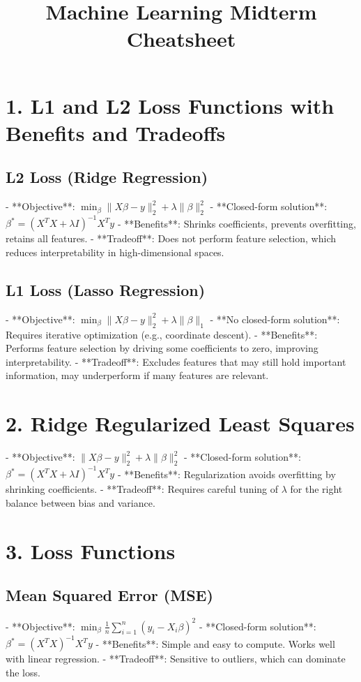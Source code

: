 \documentclass[10pt]{article}
\title{\vspace{-2cm} Machine Learning Midterm Cheatsheet}
\date{}
\begin{document}
\footnotesize
\begin{multicols}{2}

\section*{1. L1 and L2 Loss Functions with Benefits and Tradeoffs}
\subsection*{L2 Loss (Ridge Regression)}
- **Objective**: $\min_{\beta} \|X\beta - y\|_2^2 + \lambda \|\beta\|_2^2$
- **Closed-form solution**: $\beta^* = (X^TX + \lambda I)^{-1}X^Ty$
- **Benefits**: Shrinks coefficients, prevents overfitting, retains all features.
- **Tradeoff**: Does not perform feature selection, which reduces interpretability in high-dimensional spaces.

\subsection*{L1 Loss (Lasso Regression)}
- **Objective**: $\min_{\beta} \|X\beta - y\|_2^2 + \lambda \|\beta\|_1$
- **No closed-form solution**: Requires iterative optimization (e.g., coordinate descent).
- **Benefits**: Performs feature selection by driving some coefficients to zero, improving interpretability.
- **Tradeoff**: Excludes features that may still hold important information, may underperform if many features are relevant.

\section*{2. Ridge Regularized Least Squares}
- **Objective**: $\|X\beta - y\|_2^2 + \lambda\|\beta\|_2^2$
- **Closed-form solution**: $\beta^* = (X^TX + \lambda I)^{-1}X^Ty$
- **Benefits**: Regularization avoids overfitting by shrinking coefficients.
- **Tradeoff**: Requires careful tuning of \(\lambda\) for the right balance between bias and variance.

\section*{3. Loss Functions}
\subsection*{Mean Squared Error (MSE)}
- **Objective**: $\min_{\beta} \frac{1}{n} \sum_{i=1}^{n} (y_i - X_i\beta)^2$
- **Closed-form solution**: $\beta^* = (X^TX)^{-1}X^Ty$
- **Benefits**: Simple and easy to compute. Works well with linear regression.
- **Tradeoff**: Sensitive to outliers, which can dominate the loss.


\end{multicols}
\end{document}

